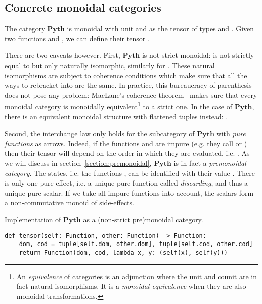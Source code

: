 \subsection{Concrete monoidal categories}

\begin{example}
The category $\mathbf{Pyth}$ is monoidal with unit \py{()} and  as the tensor of types  and .
Given two functions  and , we can define their tensor .

There are two caveats however.
First, $\mathbf{Pyth}$ is not strict monoidal:  is not strictly equal to  but only naturally isomorphic, similarly for .
These natural isomorphisms are subject to coherence conditions which make sure that all the ways to rebracket  into  are the same.
In practice, this bureaucracy of parenthesis does not pose any problem: MacLane's coherence theorem~\cite[VII]{MacLane71} makes sure that every monoidal category is monoidally equivalent\footnote
{An \emph{equivalence} of categories is an adjunction where the unit and counit are in fact natural isomorphisms.
It is a \emph{monoidal equivalence} when they are also monoidal transformations.} to a strict one.
In the case of $\mathbf{Pyth}$, there is an equivalent monoidal structure with flattened tuples instead: .

Second, the interchange law only holds for the subcategory of $\mathbf{Pyth}$ with \emph{pure functions} as arrows.
Indeed, if the functions  and  are impure (e.g. they call  or ) then their tensor  will depend on the order in which they are evaluated, i.e. .
As we will discuss in section~\ref{section:premonoidal}, $\mathbf{Pyth}$ is in fact a \emph{premonoidal category}.
The states, i.e. the functions , can be identified with their value .
There is only one pure effect, i.e. a unique pure function  called \emph{discarding}, and thus a unique pure scalar.
If we take all impure functions into account, the scalars form a non-commutative monoid of side-effects.
\end{example}

\begin{python}
{\normalfont Implementation of $\mathbf{Pyth}$ as a (non-strict pre)monoidal category.}

\begin{verbatim}
def tensor(self: Function, other: Function) -> Function:
    dom, cod = tuple[self.dom, other.dom], tuple[self.cod, other.cod]
    return Function(dom, cod, lambda x, y: (self(x), self(y)))
\end{verbatim}
\end{python}

